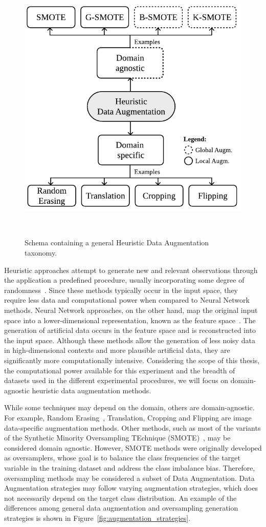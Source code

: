 \begin{figure}[ht]
	\centering
	\includegraphics[width=.5\linewidth]{data_augmentation_taxonomy}
    \caption{%
        Schema containing a general Heuristic Data Augmentation taxonomy.
    }~\label{fig:data_augmentation_taxonomy}
\end{figure}

Heuristic approaches attempt to generate new and relevant observations through
the application a predefined procedure, usually incorporating some degree of
randomness~\cite{Kashefi2020}. Since these methods typically occur in the
input space, they require less data and computational power when compared to
Neural Network methods. Neural Network approaches, on the other hand, map the
original input space into a lower-dimensional representation, known as the
feature space~\cite{DeVries2017}. The generation of artificial data occurs in
the feature space and is reconstructed into the input space. Although these
methods allow the generation of less noisy data in high-dimensional contexts
and more plausible artificial data, they are significantly more
computationally intensive. Considering the scope of this thesis, the
computational power available for this experiment and the breadth of datasets
used in the different experimental procedures, we will focus on
domain-agnostic heuristic data augmentation methods.

While some techniques may depend on the domain, others are domain-agnostic.
For example, Random Erasing~\cite{Zhong2020}, Translation, Cropping and
Flipping are image data-specific augmentation methods. Other methods, such as
most of the variants of the Synthetic Minority Oversampling TEchnique
(SMOTE)~\cite{Chawla2002}, may be considered domain agnostic. However, SMOTE
methods were originally developed as oversamplers, whose goal is to balance
the class frequencies of the target variable in the training dataset and
address the class imbalance bias. Therefore, oversampling methods may be
considered a subset of Data Augmentation. Data Augmentation strategies may
follow varying augmentation strategies, which does not necessarily depend on
the target class distribution. An example of the differences among general
data augmentation and oversampling generation strategies is shown in
Figure~\ref{fig:augmentation_strategies}.

